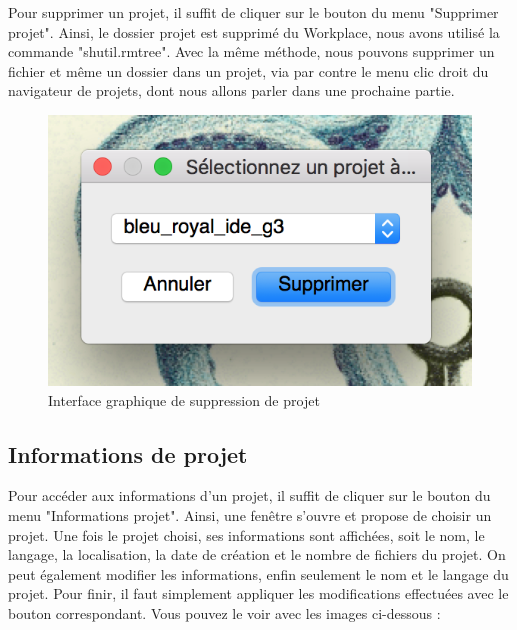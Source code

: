 \documentclass[a4paper,12pt]{article}
\begin{document}
Pour supprimer un projet, il suffit de cliquer sur le bouton du menu "Supprimer projet". Ainsi, le dossier projet est supprimé du Workplace, nous avons utilisé la commande "shutil.rmtree". Avec la même méthode, nous pouvons supprimer un fichier et même un dossier dans un projet, via par contre le menu clic droit du navigateur de projets, dont nous allons parler dans une prochaine partie.

\begin{figure}[h!]
			\begin{center}
				\includegraphics[scale=0.5]{images/imgs_projet/supp_project.png}
				\caption{Interface graphique de suppression de projet}
			\end{center}
		\end{figure}

\subsection{Informations de projet}

Pour accéder aux informations d'un projet, il suffit de cliquer sur le bouton du menu "Informations projet". Ainsi, une fenêtre s'ouvre et propose de choisir un projet. Une fois le projet choisi, ses informations sont affichées, soit le nom, le langage, la localisation, la date de création et le nombre de fichiers du projet. On peut également modifier les informations, enfin seulement le nom et le langage du projet. Pour finir, il faut simplement appliquer les modifications effectuées avec le bouton correspondant. Vous pouvez le voir avec les images ci-dessous :
\end{document}

